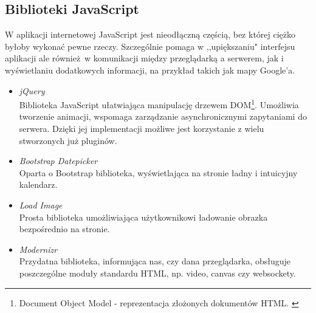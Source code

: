   \subsection{Biblioteki JavaScript}
    W aplikacji internetowej JavaScript\cite{java_script} jest nieodłączną częścią, bez której ciężko byłoby wykonać pewne rzeczy. Szczególnie pomaga w ,,upiększaniu" interfejsu aplikacji ale również w komunikacji między przeglądarką a serwerem, jak i wyświetlaniu dodatkowych informacji, na przykład takich jak mapy Google'a.

    \begin{itemize}
      \item \emph{jQuery} \\ Biblioteka JavaScript ułatwiająca manipulację drzewem DOM\footnote{Document Object Model - reprezentacja złożonych dokumentów HTML. \cite{html5_css3}}. Umożliwia tworzenie animacji, wspomaga zarządzanie asynchronicznymi zapytaniami do serwera. Dzięki jej implementacji możliwe jest korzystanie z wielu stworzonych już pluginów.
      \item \emph{Bootstrap Datepicker} \\ Oparta o Bootstrap biblioteka, wyświetlająca na stronie ładny i intuicyjny kalendarz.
      \item \emph{Load Image} \\ Prosta biblioteka umożliwiająca użytkownikowi ładowanie obrazka bezpośrednio na stronie.
      \item \emph{Modernizr} \\ Przydatna biblioteka, informująca nas, czy dana przeglądarka, obsługuje poszczególne moduły standardu HTML, np. video, canvas czy websockety.
    \end{itemize}
